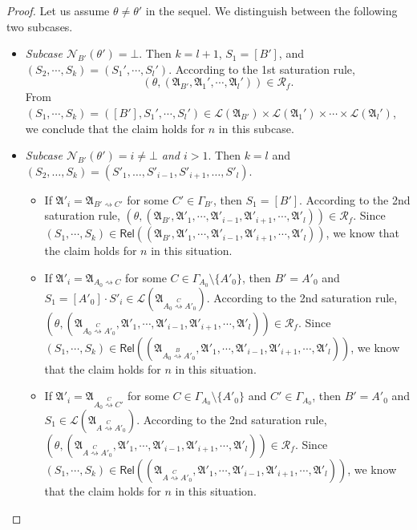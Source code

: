 \documentclass[preprint,12pt]{elsarticle}
\newcommand\act{{\sf Act}}
\newcommand\namefun{\mathcal{N}}
\newcommand\AutReach{\mathscr{R}}
\newcommand\Rel{\mathsf{Rel}}
\newcommand\Aut{{\mathfrak{A} }}
\newcommand\Lang{{\mathscr{L} }}
\newcommand\ConfSet{{\mathscr{C} }}
\begin{document}
\begin{proof}
Let us assume $\theta \neq \theta'$ in the sequel. We distinguish between the following two subcases. 
\begin{itemize}
    \item \emph{Subcase $\namefun_{B'}(\theta') = \bot$}. Then $k=l+1$, $S_1=[B']$, and $(S_2,\cdots,S_k)=(S_1',\cdots,S_l')$.  According to the 1st saturation rule, 
    $$(\theta, (\Aut_{B'}, \Aut_1', \cdots, \Aut_l')) \in \AutReach_f.$$
   From $(S_1, \cdots, S_k) = ([B'], S_1', \cdots, S_l') \in \Lang(\Aut_{B'}) \times \Lang(\Aut_1') \times \cdots \times \Lang(\Aut_l')$, we conclude that the claim holds for $n$ in this subcase.
    \item \emph{Subcase $\namefun_{B'}(\theta') = i \neq \bot$ and $i > 1$}. Then $k = l$ and $(S_2, \dots, S_k) = (S'_1, \dots, S'_{i-1}, S'_{i+1}, \dots, S'_l)$. 
\begin{itemize}
\item If $\Aut'_i = \Aut_{B' \rightsquigarrow C'}$ for some $C' \in \Gamma_{B'}$, then $S_1 = [B']$. According to the 2nd saturation rule, $(\theta, (\Aut_{B'}, \Aut'_1, \cdots, \Aut'_{i-1}, \Aut'_{i+1}, \cdots, \Aut'_l)) \in \AutReach_f$. Since $(S_1, \cdots, S_k) \in \Rel((\Aut_{B'}, \Aut'_1, \cdots, \Aut'_{i-1}, \Aut'_{i+1}, \cdots, \Aut'_l))$, we know that the claim holds for $n$ in this situation.
%
\item If $\Aut'_i = \Aut_{A_0 \rightsquigarrow C}$ for some $C \in \Gamma_{A_0} \setminus \{A'_0\}$, then $B' = A'_0$ and $S_1 = [A'_0] \cdot S'_i \in \Lang(\Aut_{A_0 \stackrel{C}{\rightsquigarrow} A'_0})$.  According to the 2nd saturation rule, $(\theta, (\Aut_{A_0 \stackrel{C}{\rightsquigarrow} A'_0}, \Aut'_1, \cdots, \Aut'_{i-1}, \Aut'_{i+1}, \cdots, \Aut'_l)) \in \AutReach_f$. Since $(S_1, \cdots, S_k) \in \Rel((\Aut_{A_0 \stackrel{B}{\rightsquigarrow} A'_0}, \Aut'_1, \cdots, \Aut'_{i-1}, \Aut'_{i+1}, \cdots, \Aut'_l))$, we know that the claim holds for $n$ in this situation.

%
\item If $\Aut'_i = \Aut_{A_0 \stackrel{C}{\rightsquigarrow} C'}$ for some $C \in \Gamma_{A_0} \setminus \{A'_0\}$ and $C' \in \Gamma_{A_0}$, then $B' = A'_0$ and $S_1 \in  \Lang(\Aut_{A \stackrel{C}{\rightsquigarrow} A'_0})$.  According to the 2nd saturation rule, $(\theta, (\Aut_{A \stackrel{C}{\rightsquigarrow} A'_0}, \Aut'_1, \cdots, \Aut'_{i-1}, \Aut'_{i+1}, \cdots, \Aut'_l)) \in \AutReach_f$. Since $(S_1, \cdots, S_k) \in \Rel((\Aut_{A \stackrel{C}{\rightsquigarrow} A'_0}, \Aut'_1, \cdots, \Aut'_{i-1}, \Aut'_{i+1}, \cdots, \Aut'_l))$, we know that the claim holds for $n$ in this situation.
\end{itemize}
\end{itemize}
 

\end{proof}
\end{document}
